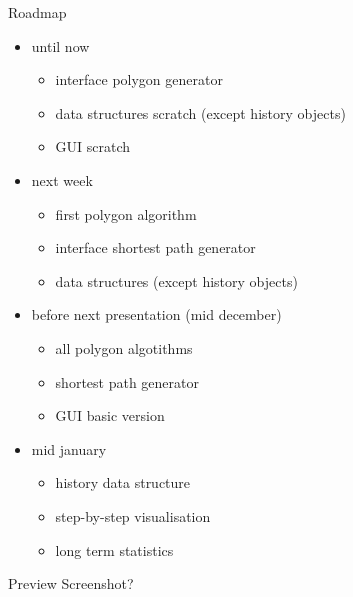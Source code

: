 \documentclass[ucs,11pt]{beamer}
\begin{document}
\begin{frame}{Roadmap}
  \begin{itemize}
    \item until now
      \begin{itemize}
        \item interface polygon generator
        \item data structures scratch (except history objects)
        \item GUI scratch
      \end{itemize}
      \item next week
      \begin{itemize}
        \item first polygon algorithm
        \item interface shortest path generator
        \item data structures (except history objects)
      \end{itemize}
      \item before next presentation (mid december)
        \begin{itemize}
          \item all polygon algotithms
          \item shortest path generator
          \item GUI basic version
        \end{itemize}
      \item mid january
        \begin{itemize}
          \item history data structure
          \item step-by-step visualisation
          \item long term statistics
        \end{itemize}
  \end{itemize}
\end{frame}

\begin{frame}{Preview}
Screenshot?
\end{frame}
\end{document}
